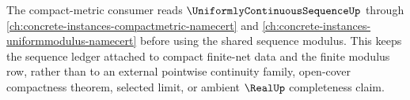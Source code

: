 The compact-metric consumer reads $\UniformlyContinuousSequenceUp$ through \autoref{ch:concrete-instances-compactmetric-namecert} and \autoref{ch:concrete-instances-uniformmodulus-namecert} before using the shared sequence modulus. This keeps the sequence ledger attached to compact finite-net data and the finite modulus row, rather than to an external pointwise continuity family, open-cover compactness theorem, selected limit, or ambient $\RealUp$ completeness claim.
